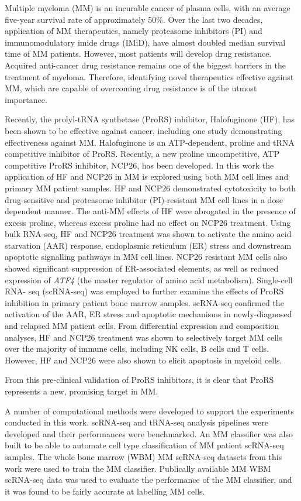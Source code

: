 
Multiple myeloma (MM) is an incurable cancer of plasma cells, with an average five-year survival rate of approximately 50\%.
Over the last two decades, application of MM therapeutics, namely proteasome inhibitors (PI) and immunomodulatory imide drugs (IMiD), have almost doubled median survival time of MM patients.
However, most patients will develop drug resistance.
Acquired anti-cancer drug resistance remains one of the biggest barriers in the treatment of myeloma.
Therefore, identifying novel therapeutics effective against MM, which are capable of overcoming drug resistance is of the utmost importance.

Recently, the prolyl-tRNA synthetase (ProRS) inhibitor, Halofuginone (HF), has been shown to be effective against cancer, including one study demonstrating effectiveness against MM\@.
Halofuginone is an ATP-dependent, proline and tRNA competitive inhibitor of ProRS\@.
Recently, a new proline uncompetitive, ATP competitive ProRS inhibitor, NCP26, has been developed.
In this work the application of HF and NCP26 in MM is explored using both MM cell lines and primary MM patient samples.
HF and NCP26 demonstrated cytotoxicity to both drug-sensitive and proteasome inhibitor (PI)-resistant MM cell lines in a dose dependent manner.
The anti-MM effects of HF were abrogated in the presence of excess proline, whereas excess proline had no effect on NCP26 treatment.
Using bulk RNA-seq, HF and NCP26 treatment was shown to activate the amino acid starvation (AAR) response, endoplasmic reticulum (ER) stress and downstream apoptotic signalling pathways in MM cell lines.
NCP26 resistant MM cells also showed significant suppression of ER-associated elements, as well as reduced expression of \textit{ATF4} (the master regulator of amino acid metabolism).
Single-cell RNA- seq (scRNA-seq) was employed to further examine the effects of ProRS inhibition in primary patient bone marrow samples.
scRNA-seq confirmed the activation of the AAR, ER stress and apoptotic mechanisms in newly-diagnosed and relapsed MM patient cells.
From differential expression and composition analyses, HF and NCP26 treatment was shown to selectively target MM cells over the majority of immune cells, including NK cells, B cells and T cells.
However, HF and NCP26 were also shown to elicit apoptosis in myeloid cells.

From this pre-clinical validation of ProRS inhibitors, it is clear that ProRS represents a new, promising target in MM\@.

A number of computational methods were developed to support the experiments conducted in this work.
scRNA-seq and tRNA-seq analysis pipelines were developed and their performances were benchmarked.
An MM classifier was also built to be able to automate cell type classification of MM patient scRNA-seq samples.
The whole bone marrow (WBM) MM scRNA-seq datasets from this work were used to train the MM classifier.
Publically available MM WBM scRNA-seq data was used to evaluate the performance of the MM classifier, and it was found to be fairly accurate at labelling MM cells.


